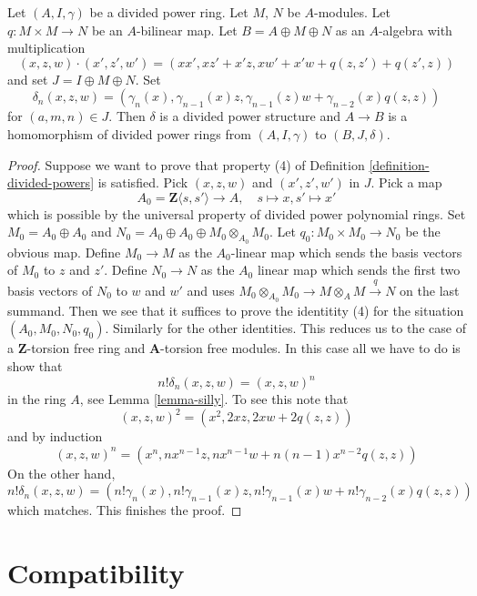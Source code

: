 \begin{lemma}
\label{lemma-divided-power-second-order-thickening}
Let $(A, I, \gamma)$ be a divided power ring. Let $M$, $N$ be $A$-modules.
Let $q : M \times M \to N$ be an $A$-bilinear map.
Let $B = A \oplus M \oplus N$ as an $A$-algebra with multiplication
$$
(x, z, w)\cdot (x', z', w') = (xx', xz' + x'z, xw' + x'w + q(z, z') + q(z', z))
$$
and set $J = I \oplus M \oplus N$. Set
$$
\delta_n(x, z, w) = (\gamma_n(x), \gamma_{n - 1}(x)z,
\gamma_{n - 1}(z)w + \gamma_{n - 2}(x)q(z, z))
$$
for $(a, m, n) \in J$.
Then $\delta$ is a divided power structure and
$A \to B$ is a homomorphism of divided power rings from
$(A, I, \gamma)$ to $(B, J, \delta)$.
\end{lemma}

\begin{proof}
Suppose we want to prove that property (4) of
Definition \ref{definition-divided-powers}
is satisfied. Pick $(x, z, w)$ and $(x', z', w')$ in $J$.
Pick a map
$$
A_0 = \mathbf{Z}\langle s, s'\rangle \longrightarrow A,\quad
s \longmapsto x,
s' \longmapsto x'
$$
which is possible by the universal property of divided power
polynomial rings. Set $M_0 = A_0 \oplus A_0$ and
$N_0 = A_0 \oplus A_0 \oplus M_0 \otimes_{A_0} M_0$.
Let $q_0 : M_0 \times M_0 \to N_0$ be the obvious map.
Define $M_0 \to M$ as the $A_0$-linear map which sends
the basis vectors of $M_0$ to $z$ and $z'$. Define $N_0 \to N$
as the $A_0$ linear map which sends the first two basis vectors
of $N_0$ to $w$ and $w'$ and uses
$M_0 \otimes_{A_0} M_0 \to M \otimes_A M \xrightarrow{q} N$
on the last summand. Then we see that it suffices to prove the
identitity (4) for the situation $(A_0, M_0, N_0, q_0)$.
Similarly for the other identities. This reduces us to the case
of a $\mathbf{Z}$-torsion free ring and $\mathbf{A}$-torsion free modules.
In this case all we have to do is show that
$$
n! \delta_n(x, z, w) = (x, z, w)^n
$$
in the ring $A$, see Lemma \ref{lemma-silly}. To see this note that
$$
(x, z, w)^2 = (x^2, 2xz, 2xw + 2q(z, z))
$$
and by induction
$$
(x, z, w)^n = (x^n, nx^{n - 1}z, nx^{n - 1}w + n(n - 1)x^{n - 2}q(z, z))
$$
On the other hand,
$$
n! \delta_n(x, z, w) = (n!\gamma_n(x), n!\gamma_{n - 1}(x)z,
n!\gamma_{n - 1}(x)w + n!\gamma_{n - 2}(x) q(z, z))
$$
which matches. This finishes the proof.
\end{proof}




\section{Compatibility}
\label{section-compatibility}

